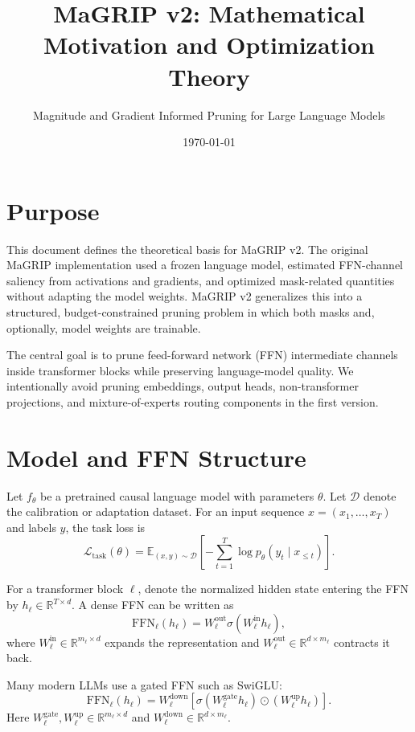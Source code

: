 \documentclass[11pt]{article}
\title{MaGRIP v2: Mathematical Motivation and Optimization Theory}
\author{Magnitude and Gradient Informed Pruning for Large Language Models}
\date{\today}
\newcommand{\R}{\mathbb{R}}
\newcommand{\E}{\mathbb{E}}
\newcommand{\Loss}{\mathcal{L}}
\newcommand{\Data}{\mathcal{D}}
\newcommand{\FFN}{\mathrm{FFN}}
\begin{document}
\maketitle

\section{Purpose}

This document defines the theoretical basis for MaGRIP v2. The original MaGRIP implementation used a frozen language model, estimated FFN-channel saliency from activations and gradients, and optimized mask-related quantities without adapting the model weights. MaGRIP v2 generalizes this into a structured, budget-constrained pruning problem in which both masks and, optionally, model weights are trainable.

The central goal is to prune feed-forward network (FFN) intermediate channels inside transformer blocks while preserving language-model quality. We intentionally avoid pruning embeddings, output heads, non-transformer projections, and mixture-of-experts routing components in the first version.

\section{Model and FFN Structure}

Let $f_{\theta}$ be a pretrained causal language model with parameters $\theta$. Let $\Data$ denote the calibration or adaptation dataset. For an input sequence $x = (x_1,\dots,x_T)$ and labels $y$, the task loss is
\begin{equation}
  \Loss_{\mathrm{task}}(\theta)
  =
  \E_{(x,y)\sim\Data}
  \left[
    -\sum_{t=1}^{T} \log p_{\theta}(y_t \mid x_{\leq t})
  \right].
\end{equation}

For a transformer block $\ell$, denote the normalized hidden state entering the FFN by $h_{\ell}\in\R^{T\times d}$. A dense FFN can be written as
\begin{equation}
  \FFN_{\ell}(h_{\ell})
  =
  W_{\ell}^{\mathrm{out}}
  \sigma\!\left(W_{\ell}^{\mathrm{in}}h_{\ell}\right),
\end{equation}
where $W_{\ell}^{\mathrm{in}}\in\R^{m_{\ell}\times d}$ expands the representation and $W_{\ell}^{\mathrm{out}}\in\R^{d\times m_{\ell}}$ contracts it back.

Many modern LLMs use a gated FFN such as SwiGLU:
\begin{equation}
  \FFN_{\ell}(h_{\ell})
  =
  W_{\ell}^{\mathrm{down}}
  \left[
    \sigma\!\left(W_{\ell}^{\mathrm{gate}}h_{\ell}\right)
    \odot
    \left(W_{\ell}^{\mathrm{up}}h_{\ell}\right)
  \right].
  \label{eq:gated-ffn}
\end{equation}
Here $W_{\ell}^{\mathrm{gate}}, W_{\ell}^{\mathrm{up}}\in\R^{m_{\ell}\times d}$ and $W_{\ell}^{\mathrm{down}}\in\R^{d\times m_{\ell}}$.
\end{document}
